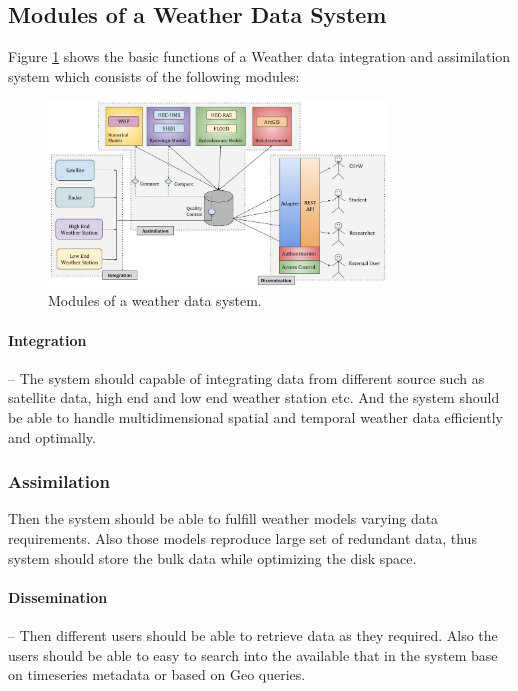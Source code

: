 \subsection{Modules of a Weather Data System}
\label{subse:modules_weather_data_integration_sys}

Figure \ref{fi:wdia_components} shows the basic functions of a Weather data integration and assimilation system which consists of the following modules:
\begin{figure}[htbp]
\centerline{\includegraphics[width=0.8\textwidth]{method/misc/weather_data_system_components.jpg}}
\caption{Modules of a weather data system.}
\label{fi:wdia_components}
\end{figure}

\paragraph{Integration}-- The system should capable of integrating data from different source such as satellite data, high end and low end weather station etc. And the system should be able to handle multidimensional spatial and temporal weather data efficiently and optimally. 
\subsubsection{Assimilation}
Then the system should be able to fulfill weather models varying data requirements. Also those models reproduce large set of redundant data, thus system should store the bulk data while optimizing the disk space.
\paragraph{Dissemination}-- Then different users should be able to retrieve data as they required. Also the users should be able to easy to search into the available that in the system base on timeseries metadata or based on Geo queries.

